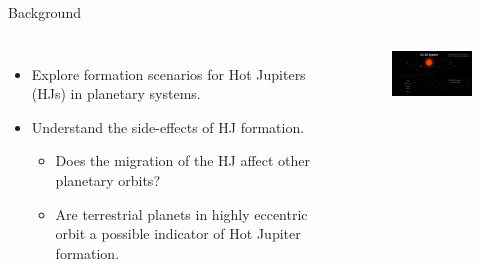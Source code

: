 \documentclass{beamer}
\begin{document}
\begin{frame}{Background}
    \begin{columns}
        \begin{itemize}
            \item Explore formation scenarios for Hot Jupiters (HJs) in planetary
                systems.
            \item Understand the side-effects of HJ formation.
                \begin{itemize}
                    \item Does the migration of the HJ affect other planetary orbits?
                    \item Are terrestrial planets in highly eccentric orbit a possible
                        indicator of Hot Jupiter formation.  
                \end{itemize}
        \end{itemize} 
            \begin{figure}
                \centering
                \includegraphics[width=1.66in]{hj_orbit}
            \end{figure}
    \end{columns}
\end{frame}
\end{document}
